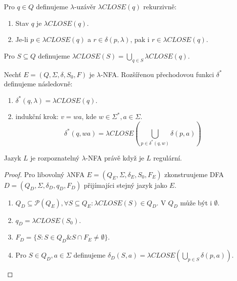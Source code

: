 \documentclass[../main.tex]{subfiles}
\begin{document}
\begin{definition}
    Pro $q\in Q$ definujeme $\lambda$-uzávěr $\lambda CLOSE(q)$ rekurzivně:
    \begin{enumerate}
        \item Stav $q$ je $\lambda CLOSE(q)$.
        \item Je-li $p \in \lambda CLOSE(q)$ a $r\in \delta(p,\lambda)$, pak i $r \in \lambda CLOSE(q)$.
    \end{enumerate}

    Pro $S \subseteq Q$ definujeme $\lambda CLOSE(S) = \bigcup_{q\in S} \lambda CLOSE(q)$. 
\end{definition}

\begin{definition}
    Nechť $E = (Q,\Sigma,\delta,S_0,F)$ je $\lambda$-NFA. Rozšířenou přechodovou funkci $\delta^*$ definujeme následovně:
    \begin{enumerate}
        \item $\delta^*(q,\lambda) = \lambda CLOSE(q)$.
        \item indukční krok: $v = wa$, kde $w\in \Sigma^*, a\in \Sigma$.
        \[\delta^*(q,wa) = \lambda CLOSE \left(\bigcup_{p\in \delta^*(q,w)}\delta (p,a)\right)\]
    \end{enumerate}
\end{definition}

\begin{theorem}
    Jazyk $L$ je rozpoznatelný $\lambda$-NFA právě když je $L$ regulární.
\end{theorem}
\begin{proof}
    Pro libovolný $\lambda$NFA $E = (Q_E,\Sigma, \delta_E, S_0, F_E)$ zkonstruujeme DFA $D = (Q_D,\Sigma, \delta_D, q_D, F_D)$
    přijímajíci stejný jazyk jako $E$.
    \begin{enumerate}
        \item $Q_D \subseteq \mathcal{P}(Q_E), \forall S \subseteq Q_E : \lambda CLOSE(S) \in Q_D$. V $Q_D$ může být i $\emptyset$.
        \item $q_D = \lambda CLOSE(S_0)$.
        \item $F_D = \{S : S\in Q_D \& S \cap F_E \neq \emptyset\}$.
        \item Pro $S \in Q_D, a\in \Sigma$ definujeme $\delta_D(S,a) = \lambda CLOSE(\bigcup_{p\in S} \delta(p,a))$. 
    \end{enumerate}
\end{proof}
\end{document}
